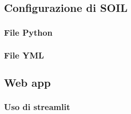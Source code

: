     \subsection{Configurazione di SOIL}

        \subsubsection{File Python}

        \subsubsection{File YML}

    \subsection{Web app}

        \subsubsection{Uso di streamlit}
